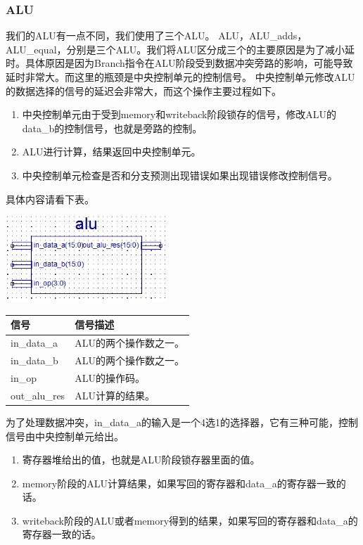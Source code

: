 \subsubsection{ALU}
    我们的ALU有一点不同，我们使用了三个ALU。
    ALU，ALU\_adds，ALU\_equal，分别是三个ALU。我们将ALU区分成三个的主要原因是为了减小延时。具体原因是因为Branch指令在ALU阶段受到数据冲突旁路的影响，可能导致延时非常大。而这里的瓶颈是中央控制单元的控制信号。
    中央控制单元修改ALU的数据选择的信号的延迟会非常大，而这个操作主要过程如下。
    \begin{enumerate}
        \item 中央控制单元由于受到memory和writeback阶段锁存的信号，修改ALU的data\_b的控制信号，也就是旁路的控制。
        \item ALU进行计算，结果返回中央控制单元。
        \item 中央控制单元检查是否和分支预测出现错误如果出现错误修改控制信号。
    \end{enumerate}
    具体内容请看下表。

\begin{center}
    \includegraphics[width=6cm]{image/detail/detail_alu.png}
    \label{fig:alu}
\end{center}
\begin{center}
    \label{table:alu}
    \begin{longtable}{p{}p{}}
        \toprule
        信号 & 信号描述 \\
        \midrule
            in\_data\_a & ALU的两个操作数之一。\\
            in\_data\_b & ALU的两个操作数之一。\\
            in\_op & ALU的操作码。\\
            out\_alu\_res & ALU计算的结果。\\
        \bottomrule
    \end{longtable}
\end{center}


    为了处理数据冲突，in\_data\_a的输入是一个4选1的选择器，它有三种可能，控制信号由中央控制单元给出。
    \begin{enumerate}
        \item 寄存器堆给出的值，也就是ALU阶段锁存器里面的值。
        \item memory阶段的ALU计算结果，如果写回的寄存器和data\_a的寄存器一致的话。
        \item writeback阶段的ALU或者memory得到的结果，如果写回的寄存器和data\_a的寄存器一致的话。
    \end{enumerate}



